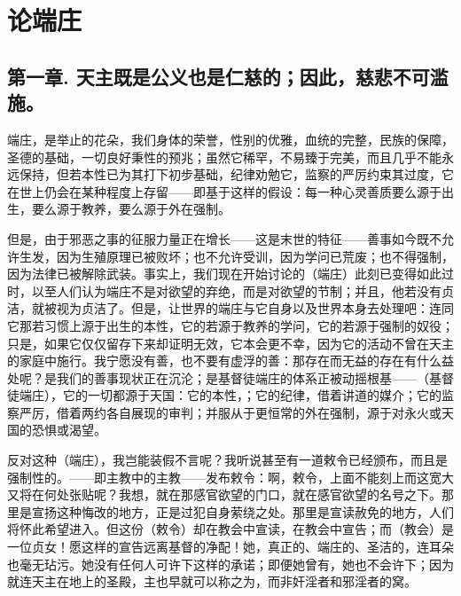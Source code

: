 
\chapter{论端庄}



\section{第一章. 天主既是公义也是仁慈的；因此，慈悲不可滥施。}

端庄，是举止的花朵，我们身体的荣誉，性别的优雅，血统的完整，民族的保障，圣德的基础，一切良好秉性的预兆；虽然它稀罕，不易臻于完美，而且几乎不能永远保持，但若本性已为其打下初步基础，纪律劝勉它，监察的严厉约束其过度，它在世上仍会在某种程度上存留——即基于这样的假设：每一种心灵善质要么源于出生，要么源于教养，要么源于外在强制。\par

但是，由于邪恶之事的征服力量正在增长——这是末世的特征——善事如今既不允许生发，因为生殖原理已被败坏；也不允许受训，因为学问已荒废；也不得强制，因为法律已被解除武装。事实上，我们现在开始讨论的（端庄）此刻已变得如此过时，以至人们认为端庄不是对欲望的弃绝，而是对欲望的节制；并且，他若没有贞洁，就被视为贞洁了。但是，让世界的端庄与它自身以及世界本身去处理吧：连同它那若习惯上源于出生的本性，它的若源于教养的学问，它的若源于强制的奴役；只是，如果它仅仅留存下来却证明无效，它本会更不幸，因为它的活动不曾在天主的家庭中施行。我宁愿没有善，也不要有虚浮的善：那存在而无益的存在有什么益处呢？是我们的善事现状正在沉沦；是基督徒端庄的体系正被动摇根基——（基督徒端庄），它的一切都源于天国：它的本性，；它的纪律，借着讲道的媒介；它的监察严厉，借着两约各自展现的审判；并服从于更恒常的外在强制，源于对永火或天国的恐惧或渴望。\par

反对这种（端庄），我岂能装假不言呢？我听说甚至有一道敕令已经颁布，而且是强制性的。——即主教中的主教——发布敕令：啊，敕令，上面不能刻上而这宽大又将在何处张贴呢？我想，就在那感官欲望的门口，就在感官欲望的名号之下。那里是宣扬这种悔改的地方，正是过犯自身萦绕之处。那里是宣读赦免的地方，人们将怀此希望进入。但这份（敕令）却在教会中宣读，在教会中宣告；而（教会）是一位贞女！愿这样的宣告远离基督的净配！她，真正的、端庄的、圣洁的，连耳朵也毫无玷污。她没有任何人可许下这样的承诺；即便她曾有，她也不会许下；因为就连天主在地上的圣殿，主也早就可以称之为，而非奸淫者和邪淫者的窝。\par

